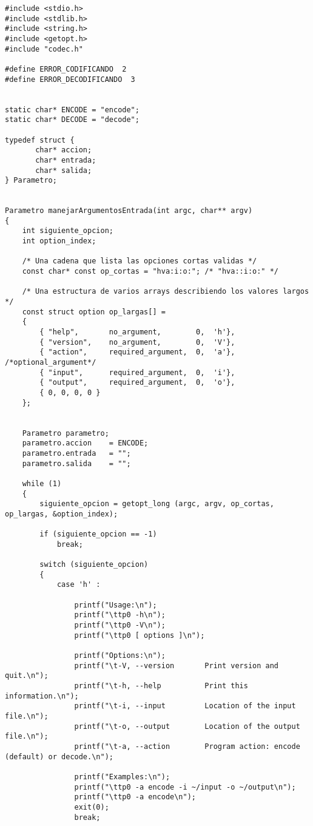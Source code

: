 \documentclass[a4paper,11pt, margin=1in]{article}
\begin{document}
\begin{verbatim}
#include <stdio.h>
#include <stdlib.h>
#include <string.h>
#include <getopt.h>
#include "codec.h"

#define ERROR_CODIFICANDO  2
#define ERROR_DECODIFICANDO  3


static char* ENCODE = "encode";
static char* DECODE = "decode";

typedef struct {
       char* accion;
       char* entrada;
       char* salida;
} Parametro;


Parametro manejarArgumentosEntrada(int argc, char** argv)
{
	int siguiente_opcion;
	int option_index;

    /* Una cadena que lista las opciones cortas validas */
    const char* const op_cortas = "hva:i:o:"; /* "hva::i:o:" */

    /* Una estructura de varios arrays describiendo los valores largos */
    const struct option op_largas[] =
	{
      	{ "help",    	no_argument,  		0,  'h'},
      	{ "version",    no_argument,  		0,  'V'},
		{ "action",    	required_argument,  0,  'a'}, /*optional_argument*/
		{ "input",     	required_argument,  0,  'i'},
		{ "output",    	required_argument,  0,  'o'},
      	{ 0, 0, 0, 0 }
    };


	Parametro parametro;
	parametro.accion 	= ENCODE;
	parametro.entrada 	= "";
	parametro.salida 	= ""; 

    while (1)
    {
        siguiente_opcion = getopt_long (argc, argv, op_cortas, op_largas, &option_index);
        
        if (siguiente_opcion == -1) 
        	break;
        
        switch (siguiente_opcion)
        {
            case 'h' :
            
                printf("Usage:\n");
                printf("\ttp0 -h\n");
                printf("\ttp0 -V\n");
                printf("\ttp0 [ options ]\n");
                
                printf("Options:\n");
                printf("\t-V, --version       Print version and quit.\n");
                printf("\t-h, --help          Print this information.\n");
                printf("\t-i, --input         Location of the input file.\n");
                printf("\t-o, --output        Location of the output file.\n");
                printf("\t-a, --action        Program action: encode (default) or decode.\n");
                
                printf("Examples:\n");
                printf("\ttp0 -a encode -i ~/input -o ~/output\n");
                printf("\ttp0 -a encode\n");
                exit(0);
	            break;


\end{verbatim}
\end{document}
